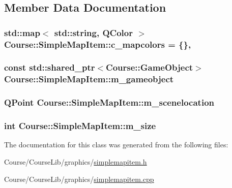 \subsection{Member Data Documentation}
\hypertarget{classCourse_1_1SimpleMapItem_adf954f1c53a9651e2634cd307be9aab4}{
\subsubsection[{c\-\_\-mapcolors}]{\setlength{\rightskip}{0pt plus 5cm}std\-::map$<$ std\-::string, Q\-Color $>$ Course\-::\-Simple\-Map\-Item\-::c\-\_\-mapcolors = \{\}\hspace{0.3cm}{\ttfamily [static]}, {\ttfamily [private]}}}\label{classCourse_1_1SimpleMapItem_adf954f1c53a9651e2634cd307be9aab4}
\hypertarget{classCourse_1_1SimpleMapItem_a4e067b04d171bb5e0a74f0f9c6419e95}{
\subsubsection[{m\-\_\-gameobject}]{\setlength{\rightskip}{0pt plus 5cm}const std\-::shared\-\_\-ptr$<${\bf Course\-::\-Game\-Object}$>$ Course\-::\-Simple\-Map\-Item\-::m\-\_\-gameobject\hspace{0.3cm}{\ttfamily [private]}}}\label{classCourse_1_1SimpleMapItem_a4e067b04d171bb5e0a74f0f9c6419e95}
\hypertarget{classCourse_1_1SimpleMapItem_a23c29a1b2a650ea0d9e5f7c1cc9a28f3}{
\subsubsection[{m\-\_\-scenelocation}]{\setlength{\rightskip}{0pt plus 5cm}Q\-Point Course\-::\-Simple\-Map\-Item\-::m\-\_\-scenelocation\hspace{0.3cm}{\ttfamily [private]}}}\label{classCourse_1_1SimpleMapItem_a23c29a1b2a650ea0d9e5f7c1cc9a28f3}
\hypertarget{classCourse_1_1SimpleMapItem_a68703106114f279f0fa103057d4b77af}{
\subsubsection[{m\-\_\-size}]{\setlength{\rightskip}{0pt plus 5cm}int Course\-::\-Simple\-Map\-Item\-::m\-\_\-size\hspace{0.3cm}{\ttfamily [private]}}}\label{classCourse_1_1SimpleMapItem_a68703106114f279f0fa103057d4b77af}


The documentation for this class was generated from the following files\-:\begin{DoxyCompactItemize}
\item 
Course/\-Course\-Lib/graphics/\hyperlink{simplemapitem_8h}{simplemapitem.\-h}\item 
Course/\-Course\-Lib/graphics/\hyperlink{simplemapitem_8cpp}{simplemapitem.\-cpp}\end{DoxyCompactItemize}
